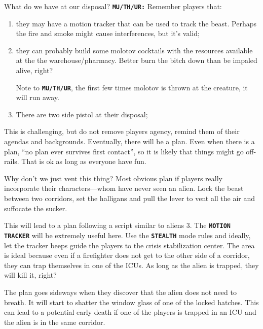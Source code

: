 \begin{rpg-commentbox}{What do we have at our disposal?}
   \texttt{\textbf{MU/TH/UR:}} Remember players that:
   
   
   \begin{enumerate}
      \item they may have a motion tracker that can be used to track the beast. Perhaps the fire and smoke might cause interferences, but it's valid;
      \item they can probably build some molotov cocktails with the resources available at the the warehouse/pharmacy. Better burn the bitch down than be impaled alive, right?
      
      Note to \texttt{\textbf{MU/TH/UR}}, the first few times molotov is thrown at the creature, it will run away.      
      
      \item There are two side pistol at their disposal;
   \end{enumerate}

   This is challenging, but do not remove players agency, remind them of their agendas and backgrounds. Eventually, there will be a plan. Even when there is a plan, ``no plan ever survives first contact'', so it is likely that things might go off-rails. That is ok as long as everyone have fun. 
\end{rpg-commentbox}

\newsect

\begin{rpg-commentbox}{Why don't we just vent this thing?}
    Most obvious plan if players really incorporate their characters---whom have never seen an alien. Lock the beast between two corridors, set the halligans and pull the lever to vent all the air and suffocate the sucker. 
    
    This will lead to a plan following a script similar to aliens 3. The \texttt{\textbf{MOTION TRACKER}} will be extremely useful here. Use the \texttt{\textbf{STEALTH}} mode rules and ideally, let the tracker beeps guide the players to the crisis stabilization center. The area is ideal because even if a firefighter does not get to the other side of a corridor, they can trap themselves in one of the ICUs. As long as the alien is trapped, they will kill it, right?

    The plan goes sideways when they discover that the alien does not need to breath. It will start to shatter the window glass of one of the locked hatches. This can lead to a potential early death if one of the players is trapped in an ICU and the alien is in the same corridor.
\end{rpg-commentbox}

